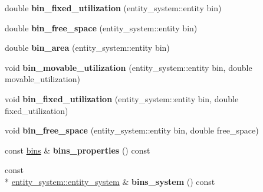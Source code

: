 \begin{DoxyCompactItemize}
\item 
\hypertarget{classophidian_1_1density_1_1density__map_ad019e95e65ed5c50dae65b2196ea6598}{double {\bfseries bin\-\_\-fixed\-\_\-utilization} (entity\-\_\-system\-::entity bin)}\label{classophidian_1_1density_1_1density__map_ad019e95e65ed5c50dae65b2196ea6598}

\item 
\hypertarget{classophidian_1_1density_1_1density__map_adddee904407acbfbb9dccccd66f7fac5}{double {\bfseries bin\-\_\-free\-\_\-space} (entity\-\_\-system\-::entity bin)}\label{classophidian_1_1density_1_1density__map_adddee904407acbfbb9dccccd66f7fac5}

\item 
\hypertarget{classophidian_1_1density_1_1density__map_a6c44296939b38d45629a790c94c4cd95}{double {\bfseries bin\-\_\-area} (entity\-\_\-system\-::entity bin)}\label{classophidian_1_1density_1_1density__map_a6c44296939b38d45629a790c94c4cd95}

\item 
\hypertarget{classophidian_1_1density_1_1density__map_a6628316770ce88bf39454e668f2266a6}{void {\bfseries bin\-\_\-movable\-\_\-utilization} (entity\-\_\-system\-::entity bin, double movable\-\_\-utilization)}\label{classophidian_1_1density_1_1density__map_a6628316770ce88bf39454e668f2266a6}

\item 
\hypertarget{classophidian_1_1density_1_1density__map_a7aecbed18da85e79d5715de4c39b722a}{void {\bfseries bin\-\_\-fixed\-\_\-utilization} (entity\-\_\-system\-::entity bin, double fixed\-\_\-utilization)}\label{classophidian_1_1density_1_1density__map_a7aecbed18da85e79d5715de4c39b722a}

\item 
\hypertarget{classophidian_1_1density_1_1density__map_adf972913a640ca1a906cc6f464737519}{void {\bfseries bin\-\_\-free\-\_\-space} (entity\-\_\-system\-::entity bin, double free\-\_\-space)}\label{classophidian_1_1density_1_1density__map_adf972913a640ca1a906cc6f464737519}

\item 
\hypertarget{classophidian_1_1density_1_1density__map_a692e26c35c18462b204cf54abd0a814b}{const \hyperlink{classophidian_1_1density_1_1bins}{bins} \& {\bfseries bins\-\_\-properties} () const }\label{classophidian_1_1density_1_1density__map_a692e26c35c18462b204cf54abd0a814b}

\item 
\hypertarget{classophidian_1_1density_1_1density__map_a6e407c9c75b760e5ddfadc23b267d112}{const \\*
\hyperlink{classophidian_1_1entity__system_1_1entity__system}{entity\-\_\-system\-::entity\-\_\-system} \& {\bfseries bins\-\_\-system} () const }\label{classophidian_1_1density_1_1density__map_a6e407c9c75b760e5ddfadc23b267d112}


\end{DoxyCompactItemize}
